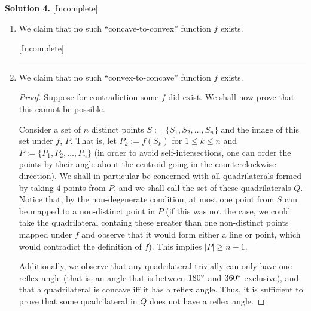 \begin{solution}{4}
    \textbf{Solution 4.} [Incomplete] 

    \begin{enumerate}[label=\alph*)]
        \item \begin{claim}
            We claim that no such ``concave-to-convex'' function \( f \) exists.
        \end{claim}

        [Incomplete]

        \begin{center}
        \rule{10cm}{0.5pt}
        \end{center}

    \item \begin{claim}
            We claim that no such ``convex-to-concave'' function \( f \) exists.
        \end{claim}

        \begin{proof}
            Suppose for contradiction some \( f \) did exist. We shall now
            prove that this cannot be possible.

            Consider a set of \( n \) distinct points \( S := \{S_1, S_2,
            \ldots, S_n\} \) and the image of this set under \( f \), \( P \).
            That is, let \( P_k := f(S_k) \) for \( 1 \le k \le n \) and \( P
            := \{ P_1, P_2, \ldots, P_n \} \) (in order to avoid
            self-intersections, one can order the points by their angle about
            the centroid going in the counterclockwise direction). We shall in
            particular be concerned with all quadrilaterals formed by taking \(
            4 \) points from \( P \), and we shall call the set of these
            quadrilaterals \( Q \). Notice that, by the non-degenerate
            condition, at most one point from \( S \) can be mapped to a
            non-distinct point in \( P \) (if this was not the case, we could
            take the quadrilateral containg these greater than one non-distinct
            points mapped under \( f \) and observe that it would form either a
            line or point, which would contradict the definition of \( f \)).
            This implies \( |P| \ge n - 1 \).

            Additionally, we observe that any quadrilateral trivially can only
            have one reflex angle (that is, an angle that is between \(
            180\degree \) and \( 360\degree \) exclusive), and that a
            quadrilateral is concave iff it has a reflex angle. Thus, it is
            sufficient to prove that some quadrilateral in \( Q \) does not
            have a reflex angle.


\end{proof}
\end{enumerate}
\end{solution}
